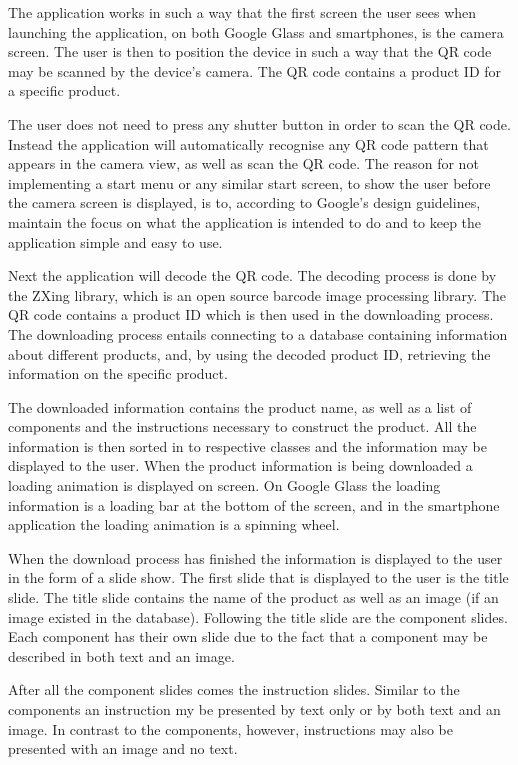 The application works in such a way that the first screen the user sees when launching the application, on both Google Glass and smartphones, is the camera screen. The user is then to position the device in such a way that the QR code may be scanned by the device's camera. The QR code contains a product ID for a specific product.

The user does not need to press any shutter button in order to scan the QR code. Instead the application will automatically recognise any QR code pattern that appears in the camera view, as well as scan the QR code. The reason for not implementing a start menu or any similar start screen, to show the user before the camera screen is displayed, is to, according to Google's design guidelines, maintain the focus on what the application is intended to do and to keep the application simple and easy to use.

Next the application will decode the QR code. The decoding process is done by the ZXing library, which is an open source  barcode image processing library. The QR code contains a product ID which is then used in the downloading process. The downloading process entails connecting to a database containing information about different products, and, by using the decoded product ID, retrieving the information on the specific product. 

The downloaded information contains the product name, as well as a list of components and the instructions necessary to construct the product. All the information is then sorted in to respective classes and the information may be displayed to the user. When the product information is being downloaded a loading animation is displayed on screen. On Google Glass the loading information is a loading bar at the bottom of the screen, and in the smartphone application the loading animation is a spinning wheel.

When the download process has finished the information is displayed to the user in the form of a slide show. The first slide that is displayed to the user is the title slide. The title slide contains the name of the product as well as an image  (if an image existed in the database). Following the title slide are the component slides. Each component has their own slide due to the fact that a component may be described in both text and an image. 

After all the component slides comes the instruction slides. Similar to the components an instruction my be presented by text only or by both text and an image. In contrast to the components, however, instructions may also be presented with an image and no text. 

